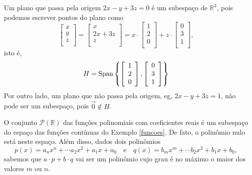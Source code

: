 \begin{ex}
	Um plano que passa pela origem $2x - y + 3z = 0$ é um subespaço de $\mathbb{R}^3$, pois podemos escrever pontos do plano como
	\begin{equation}
	\left[
	\begin{array}{c}
	x \\
	y \\
	z \\
	\end{array}
	\right] =
	\left[
	\begin{array}{c}
	x \\
	2x +3z \\
	z \\
	\end{array}
	\right] = x \cdot
	\left[
	\begin{array}{c}
	1 \\
	2 \\
	0 \\
	\end{array}
	\right] + z \cdot
	\left[
	\begin{array}{c}
	0 \\
	3 \\
	1 \\
	\end{array}
	\right],
	\end{equation} isto é,
	\begin{equation}
	H = \operatorname{Span} \left\{
	\left[
	\begin{array}{c}
	1 \\
	2 \\
	0 \\
	\end{array}
	\right],
	\left[
	\begin{array}{c}
	0 \\
	3 \\
	1 \\
	\end{array}
	\right]
	\right\}
	\end{equation} Por outro lado, um plano que não passa pela origem, eg, $2x - y + 3z = 1$, não pode ser um subespaço, pois $\vec{0} \not\in H$.
\end{ex}



\begin{ex}
	O conjunto $\mathcal{P} (\mathbb{R})$ das funções polinomiais com coeficientes reais é um subespaço do espaço das funções contínuas do Exemplo \ref{funcoes}. De fato, o polinômio nulo está neste espaço. Além disso, dados dois polinômios
	\begin{equation}
	p(x) = a_n x^n + \cdots a_2 x^2 + a_1 x + a_0 \quad \text{e} \quad q(x) = b_m x^m + \cdots b_2 x^2 + b_1 x + b_0,
	\end{equation} sabemos que $a \cdot p + b \cdot q$ vai ser um polinômio cujo grau é no máximo o maior dos valores $m$ ou $n$.
\end{ex}


